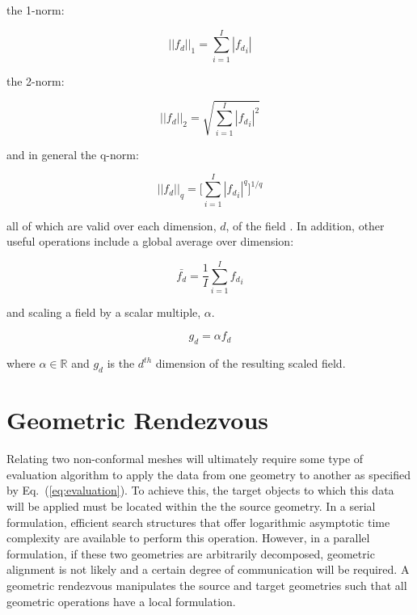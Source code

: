 \documentclass[letterpaper,12pt]{article}
\begin{document}
the 1-norm:

\begin{equation}
  ||f_d||_1 = \sum_{i=1}^I |{f_d}_i|
  \label{eq:one_norm}
\end{equation}

the 2-norm:

\begin{equation}
  ||f_d||_2 = \sqrt{ \sum_{i=1}^I |{f_d}_i|^2 }
  \label{eq:two_norm}
\end{equation}

and in general the q-norm:

\begin{equation}
||f_d||_q = \Bigg[ \sum_{i=1}^I |{f_d}_i|^q \Bigg]^{1/q}
  \label{eq:q_norm}
\end{equation}

all of which are valid over each dimension, $d$, of the field
\cite{LeVeque_2007}. In addition, other useful operations include a
global average over dimension:

\begin{equation}
  \bar{f_d} = \frac{1}{I}\sum_{i=1}^I {f_d}_i
  \label{eq:average}
\end{equation}

and scaling a field by a scalar multiple, $\alpha$.

\begin{equation}
  g_d = \alpha f_d
  \label{eq:field_scaling}
\end{equation}

where $\alpha \in \mathbb{R}$ and $g_d$ is the $d^{th}$ dimension of
the resulting scaled field.

\clearpage

\section{Geometric Rendezvous}\label{sec:rendezvous}
Relating two non-conformal meshes will ultimately require some type of
evaluation algorithm to apply the data from one geometry to another as
specified by Eq.~(\ref{eq:evaluation}). To achieve this, the target
objects to which this data will be applied must be located within the
the source geometry. In a serial formulation, efficient search
structures that offer logarithmic asymptotic time complexity are
available to perform this operation. However, in a parallel
formulation, if these two geometries are arbitrarily decomposed,
geometric alignment is not likely and a certain degree of
communication will be required. A geometric rendezvous manipulates the
source and target geometries such that all geometric operations have a
local formulation.
\end{document}
